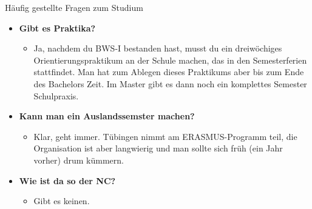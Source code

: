 \begin{block}{Häufig gestellte Fragen zum Studium}
\begin{large}
\begin{itemize}
\item \textbf{Gibt es Praktika?}
\begin{itemize}
	\item Ja, nachdem du BWS-I bestanden hast, musst du ein dreiwöchiges Orientierungspraktikum an der Schule machen, das in den Semesterferien stattfindet. Man hat zum Ablegen dieses Praktikums aber bis zum Ende des Bachelors Zeit. Im Master gibt es dann noch ein komplettes Semester Schulpraxis.
\end{itemize}

\item \textbf{Kann man ein Auslandssemster machen?}
\begin{itemize}
	\item  Klar, geht immer. Tübingen nimmt am ERASMUS-Programm teil, die Organisation ist aber langwierig und man sollte sich früh (ein Jahr vorher) drum kümmern.
\end{itemize}

\item \textbf{Wie ist da so der NC?}
\begin{itemize}
	\item Gibt es keinen.
\end{itemize}
	\end{itemize}
\end{large}
\end{block}